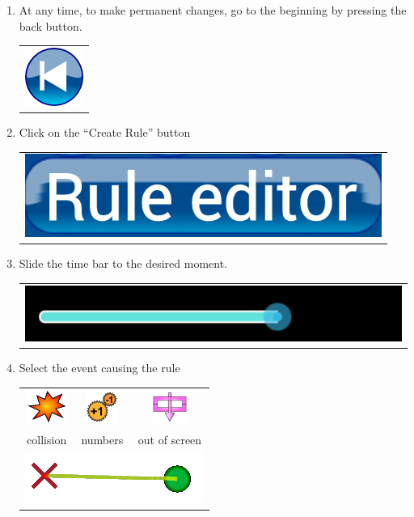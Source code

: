 \documentclass[12pt]{article} %
\begin{document}
\begin{enumerate}
 \item At any time, to make permanent changes,
 go to the beginning by pressing the back button.
 \begin{tabular}{l}\includegraphics[scale=0.04]{captures/back}\end{tabular}
 \item Click on the ``Create Rule'' button
 \begin{tabular}{l}\includegraphics[scale=0.2]{captures/ruleEditorButton}\end{tabular}
 \item Slide the time bar to the desired moment.
 \begin{tabular}{l}\includegraphics[scale=0.2]{captures/timebar}\end{tabular}
 \item Select the event causing the rule
 \begin{tabular}{ccc} \includegraphics[scale=0.8]{captures/bing} &
 \includegraphics[scale=0.8]{captures/numbers} & 
 \includegraphics[scale=0.8]{captures/outscreen} \\ collision &
 numbers & out of screen \\
 \multicolumn{3}{c}{ \includegraphics[scale=0.8]{captures/touchdownup}} \\

\end{tabular}
\end{enumerate}
\end{document}
